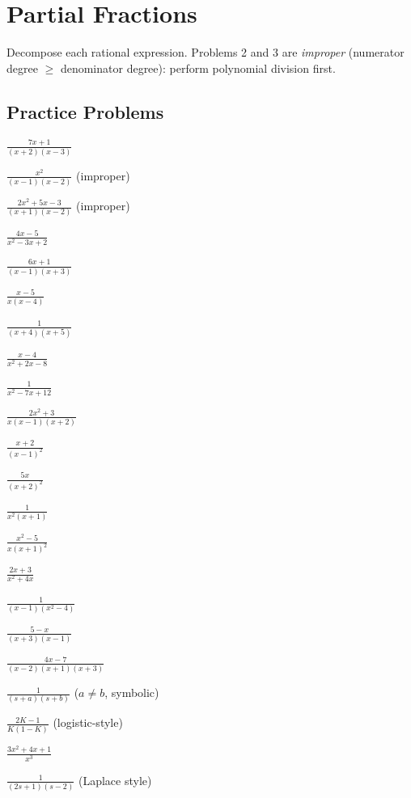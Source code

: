 \chapter{Partial Fractions}

Decompose each rational expression. Problems 2 and 3 are \emph{improper}
(numerator degree $\ge$ denominator degree): perform polynomial division
first.

\section{Practice Problems}

\begin{problems}
  \item $\displaystyle\frac{7x+1}{(x+2)(x-3)}$
  \item $\displaystyle\frac{x^{2}}{(x-1)(x-2)}$ (improper)
  \item $\displaystyle\frac{2x^{2}+5x-3}{(x+1)(x-2)}$ (improper)
  \item $\displaystyle\frac{4x-5}{x^{2}-3x+2}$
  \item $\displaystyle\frac{6x+1}{(x-1)(x+3)}$
  \item $\displaystyle\frac{x-5}{x(x-4)}$
  \item $\displaystyle\frac{1}{(x+4)(x+5)}$
  \item $\displaystyle\frac{x-4}{x^{2}+2x-8}$
  \item $\displaystyle\frac{1}{x^{2}-7x+12}$
  \item $\displaystyle\frac{2x^{2}+3}{x(x-1)(x+2)}$
  \item $\displaystyle\frac{x+2}{(x-1)^{2}}$
  \item $\displaystyle\frac{5x}{(x+2)^{2}}$
  \item $\displaystyle\frac{1}{x^{2}(x+1)}$
  \item $\displaystyle\frac{x^{2}-5}{x(x+1)^{2}}$
  \item $\displaystyle\frac{2x+3}{x^{2}+4x}$
  \item $\displaystyle\frac{1}{(x-1)(x^{2}-4)}$
  \item $\displaystyle\frac{5-x}{(x+3)(x-1)}$
  \item $\displaystyle\frac{4x-7}{(x-2)(x+1)(x+3)}$
  \item $\displaystyle\frac{1}{(s+a)(s+b)}$ ($a\neq b$, symbolic)
  \item $\displaystyle\frac{2K-1}{K(1-K)}$ (logistic-style)
  \item $\displaystyle\frac{3x^{2}+4x+1}{x^{3}}$
  \item $\displaystyle\frac{1}{(2s+1)(s-2)}$ (Laplace style)

\end{problems}
